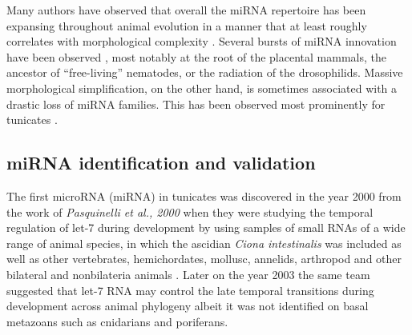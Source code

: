 \documentclass[graybox]{svmult}
\begin{document}
Many authors have observed that overall the miRNA repertoire has been
expansing throughout animal evolution in a manner that at least roughly
correlates with morphological complexity
\cite{Hertel:06a, Sempere:06, Niwa:07, Prochnik:07, Lee:07a, Heimberg:08, Peterson:09, Berezikov:11}. 
Several bursts of miRNA innovation have been observed
\cite{Hertel:06a, Heimberg:08, Tanzer:10a, Hertel:15a}, most notably at the
root of the placental mammals, the ancestor of ``free-living'' nematodes,
or the radiation of the drosophilids. Massive morphological simplification,
on the other hand, is sometimes associated with a drastic loss of miRNA
families. This has been observed most prominently for tunicates
\cite{Fu:08, Dai:09}.



\subsection{miRNA identification and validation}

The first microRNA (miRNA) in tunicates was discovered in the year 2000 from 
the work of \textit{Pasquinelli et al., 2000} when they were studying 
the temporal regulation of let-7 during development by using samples of small 
RNAs of a wide range of animal species, in which the ascidian \textit{Ciona 
intestinalis} was included as well as other vertebrates, hemichordates, mollusc, 
annelids, arthropod and other bilateral and nonbilateria animals 
\cite{Pasquinelli2000}. Later on the year 2003 the same team suggested that 
let-7 RNA may control the late temporal transitions during development across 
animal phylogeny \cite{Pasquinelli2003} albeit it was not identified on basal 
metazoans such as cnidarians and poriferans. 
\end{document}
